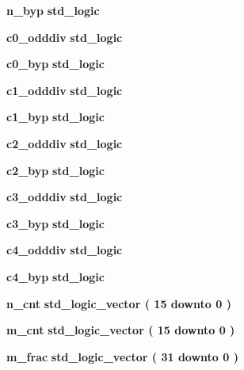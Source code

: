 \begin{DoxyCompactItemize}
{\bf n\+\_\+byp} {\bfseries \textcolor{comment}{std\+\_\+logic}\textcolor{vhdlchar}{ }} 
\item 
{\bf c0\+\_\+odddiv} {\bfseries \textcolor{comment}{std\+\_\+logic}\textcolor{vhdlchar}{ }} 
\item 
{\bf c0\+\_\+byp} {\bfseries \textcolor{comment}{std\+\_\+logic}\textcolor{vhdlchar}{ }} 
\item 
{\bf c1\+\_\+odddiv} {\bfseries \textcolor{comment}{std\+\_\+logic}\textcolor{vhdlchar}{ }} 
\item 
{\bf c1\+\_\+byp} {\bfseries \textcolor{comment}{std\+\_\+logic}\textcolor{vhdlchar}{ }} 
\item 
{\bf c2\+\_\+odddiv} {\bfseries \textcolor{comment}{std\+\_\+logic}\textcolor{vhdlchar}{ }} 
\item 
{\bf c2\+\_\+byp} {\bfseries \textcolor{comment}{std\+\_\+logic}\textcolor{vhdlchar}{ }} 
\item 
{\bf c3\+\_\+odddiv} {\bfseries \textcolor{comment}{std\+\_\+logic}\textcolor{vhdlchar}{ }} 
\item 
{\bf c3\+\_\+byp} {\bfseries \textcolor{comment}{std\+\_\+logic}\textcolor{vhdlchar}{ }} 
\item 
{\bf c4\+\_\+odddiv} {\bfseries \textcolor{comment}{std\+\_\+logic}\textcolor{vhdlchar}{ }} 
\item 
{\bf c4\+\_\+byp} {\bfseries \textcolor{comment}{std\+\_\+logic}\textcolor{vhdlchar}{ }} 
\item 
{\bf n\+\_\+cnt} {\bfseries \textcolor{comment}{std\+\_\+logic\+\_\+vector}\textcolor{vhdlchar}{ }\textcolor{vhdlchar}{(}\textcolor{vhdlchar}{ }\textcolor{vhdlchar}{ } \textcolor{vhdldigit}{15} \textcolor{vhdlchar}{ }\textcolor{keywordflow}{downto}\textcolor{vhdlchar}{ }\textcolor{vhdlchar}{ } \textcolor{vhdldigit}{0} \textcolor{vhdlchar}{ }\textcolor{vhdlchar}{)}\textcolor{vhdlchar}{ }} 
\item 
{\bf m\+\_\+cnt} {\bfseries \textcolor{comment}{std\+\_\+logic\+\_\+vector}\textcolor{vhdlchar}{ }\textcolor{vhdlchar}{(}\textcolor{vhdlchar}{ }\textcolor{vhdlchar}{ } \textcolor{vhdldigit}{15} \textcolor{vhdlchar}{ }\textcolor{keywordflow}{downto}\textcolor{vhdlchar}{ }\textcolor{vhdlchar}{ } \textcolor{vhdldigit}{0} \textcolor{vhdlchar}{ }\textcolor{vhdlchar}{)}\textcolor{vhdlchar}{ }} 
\item 
{\bf m\+\_\+frac} {\bfseries \textcolor{comment}{std\+\_\+logic\+\_\+vector}\textcolor{vhdlchar}{ }\textcolor{vhdlchar}{(}\textcolor{vhdlchar}{ }\textcolor{vhdlchar}{ } \textcolor{vhdldigit}{31} \textcolor{vhdlchar}{ }\textcolor{keywordflow}{downto}\textcolor{vhdlchar}{ }\textcolor{vhdlchar}{ } \textcolor{vhdldigit}{0} \textcolor{vhdlchar}{ }\textcolor{vhdlchar}{)}\textcolor{vhdlchar}{ }} 

\end{DoxyCompactItemize}
